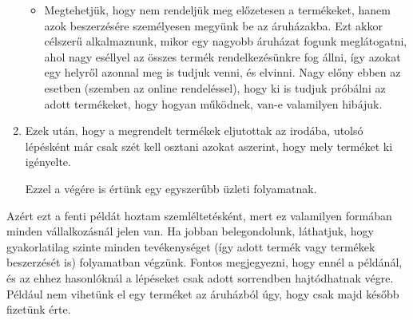 \begin{enumerate}
\begin{itemize}
\item Megtehetjük, hogy nem rendeljük meg előzetesen a termékeket, hanem azok beszerzésére személyesen megyünk be az áruházakba. Ezt akkor célszerű alkalmaznunk, mikor egy nagyobb áruházat fogunk meglátogatni, ahol nagy eséllyel az összes termék rendelkezésünkre fog állni, így azokat egy helyről azonnal meg is tudjuk venni, és elvinni. Nagy előny ebben az esetben (szemben az online rendeléssel), hogy ki is tudjuk próbálni az adott termékeket, hogy hogyan működnek, van-e valamilyen hibájuk.
\end{itemize}

\item Ezek után, hogy a megrendelt termékek eljutottak az irodába, utolsó lépésként már csak szét kell osztani azokat aszerint, hogy mely terméket ki igényelte.

Ezzel a végére is értünk egy egyszerűbb üzleti folyamatnak.
\end{enumerate}

Azért ezt a fenti példát hoztam szemléltetésként, mert ez valamilyen formában minden vállalkozásnál jelen van. Ha jobban belegondolunk, láthatjuk, hogy gyakorlatilag szinte minden tevékenységet (így adott termék vagy termékek beszerzését is) folyamatban végzünk. Fontos megjegyezni, hogy ennél a példánál, és az ehhez hasonlóknál a lépéseket csak adott sorrendben hajtódhatnak végre. Például nem vihetünk el egy terméket az áruházból úgy, hogy csak majd később fizetünk érte.






